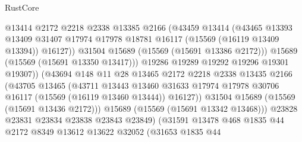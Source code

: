\begin{lexlean}{RustCore}
\begin{coremodule}
                              @13414
                              @2172
                              @2218
                              @2338
                              @13385
                              @2166
                              (@43459
                                @13414
                                (@43465
                                  @13393
                                  @13409
                                  @31407
                                  @17974
                                  @17978
                                  @18781
                                  @16117
                                  (@15569 (@16119 @13409 @13394))
                                  @16127))
                              @31504
                              @15689
                              (@15569 (@15691 @13386 @2172)))
                            @15689
                            (@15569 (@15691 @13350 @13417)))
                          @19286
                          @19289
                          @19292
                          @19296
                          @19301
                          @19307))
                      (@43694
                        @148
                        @11
                        @28
                        @13465
                        @2172
                        @2218
                        @2338
                        @13435
                        @2166
                        (@43705
                          @13465
                          (@43711
                            @13443
                            @13460
                            @31633
                            @17974
                            @17978
                            @30706
                            @16117
                            (@15569 (@16119 @13460 @13444))
                            @16127))
                        @31504
                        @15689
                        (@15569 (@15691 @13436 @2172)))
                      @15689
                      (@15569 (@15691 @13342 @13468)))
                    @23828
                    @23831
                    @23834
                    @23838
                    @23843
                    @23849)
                  (@31591
                    @13478
                    @468
                    @1835
                    @44
                    @2172
                    @8349
                    @13612
                    @13622
                    @32052
                    (@31653
                      @1835
                      @44

\end{coremodule}
\end{lexlean}
